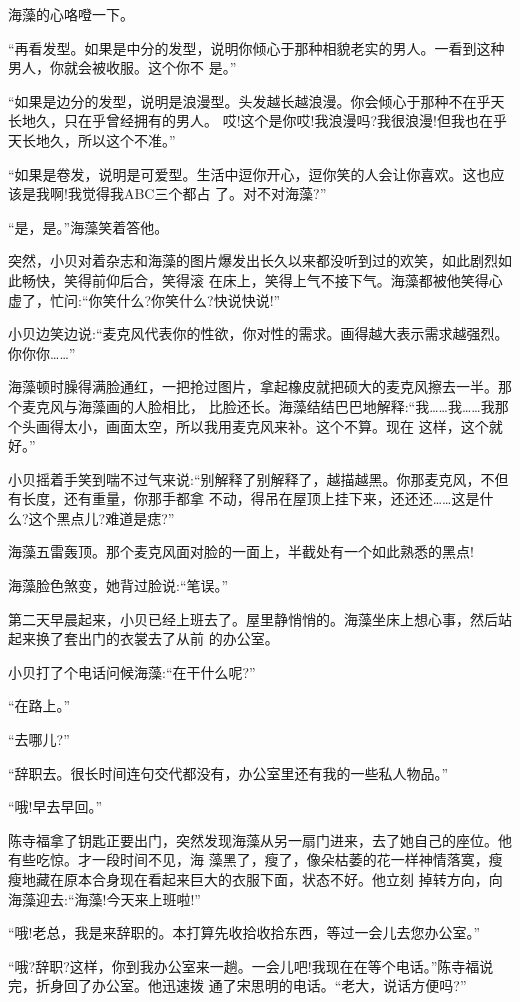 \documentclass[11pt,a4paper,onecolumn]{article}
\begin{document}
海藻的心咯噔一下。

``再看发型。如果是中分的发型，说明你倾心于那种相貌老实的男人。一看到这种男人，你就会被收服。这个你不
是。''

``如果是边分的发型，说明是浪漫型。头发越长越浪漫。你会倾心于那种不在乎天长地久，只在乎曾经拥有的男人。
哎!这个是你哎!我浪漫吗?我很浪漫!但我也在乎天长地久，所以这个不准。''

``如果是卷发，说明是可爱型。生活中逗你开心，逗你笑的人会让你喜欢。这也应该是我啊!我觉得我ABC三个都占
了。对不对海藻?''

``是，是。''海藻笑着答他。

突然，小贝对着杂志和海藻的图片爆发出长久以来都没听到过的欢笑，如此剧烈如此畅快，笑得前仰后合，笑得滚
在床上，笑得上气不接下气。海藻都被他笑得心虚了，忙问:``你笑什么?你笑什么?快说快说!''

小贝边笑边说:``麦克风代表你的性欲，你对性的需求。画得越大表示需求越强烈。你你你……''

海藻顿时臊得满脸通红，一把抢过图片，拿起橡皮就把硕大的麦克风擦去一半。那个麦克风与海藻画的人脸相比，
比脸还长。海藻结结巴巴地解释:``我……我……我那个头画得太小，画面太空，所以我用麦克风来补。这个不算。现在
这样，这个就好。''

小贝摇着手笑到喘不过气来说:``别解释了别解释了，越描越黑。你那麦克风，不但有长度，还有重量，你那手都拿
不动，得吊在屋顶上挂下来，还还还……这是什么?这个黑点儿?难道是痣?''

海藻五雷轰顶。那个麦克风面对脸的一面上，半截处有一个如此熟悉的黑点!

海藻脸色煞变，她背过脸说:``笔误。''

第二天早晨起来，小贝已经上班去了。屋里静悄悄的。海藻坐床上想心事，然后站起来换了套出门的衣裳去了从前
的办公室。

小贝打了个电话问候海藻:``在干什么呢?''

``在路上。''

``去哪儿?''

``辞职去。很长时间连句交代都没有，办公室里还有我的一些私人物品。''

``哦!早去早回。''

陈寺福拿了钥匙正要出门，突然发现海藻从另一扇门进来，去了她自己的座位。他有些吃惊。才一段时间不见，海
藻黑了，瘦了，像朵枯萎的花一样神情落寞，瘦瘦地藏在原本合身现在看起来巨大的衣服下面，状态不好。他立刻
掉转方向，向海藻迎去:``海藻!今天来上班啦!''

``哦!老总，我是来辞职的。本打算先收拾收拾东西，等过一会儿去您办公室。''

``哦?辞职?这样，你到我办公室来一趟。一会儿吧!我现在在等个电话。''陈寺福说完，折身回了办公室。他迅速拨
通了宋思明的电话。``老大，说话方便吗?''
\end{document}
